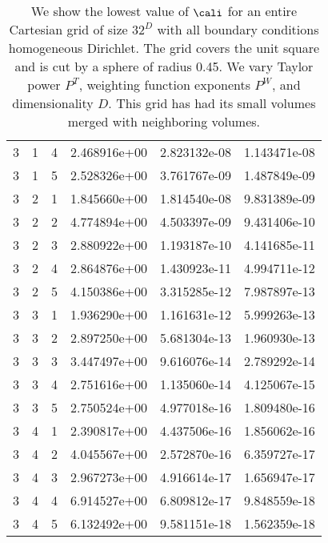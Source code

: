 \documentclass{article}
\begin{document}
{\begin{small}
\begin{table}
\begin{center}
\begin{tabular}{|ccc|ccc|}
3 & 1 & 4  & 2.468916e+00 & 2.823132e-08 & 1.143471e-08 \\ 
3 & 1 & 5  & 2.528326e+00 & 3.761767e-09 & 1.487849e-09 \\ 
3 & 2 & 1  & 1.845660e+00 & 1.814540e-08 & 9.831389e-09 \\ 
3 & 2 & 2  & 4.774894e+00 & 4.503397e-09 & 9.431406e-10 \\ 
3 & 2 & 3  & 2.880922e+00 & 1.193187e-10 & 4.141685e-11 \\ 
3 & 2 & 4  & 2.864876e+00 & 1.430923e-11 & 4.994711e-12 \\ 
3 & 2 & 5  & 4.150386e+00 & 3.315285e-12 & 7.987897e-13 \\ 
3 & 3 & 1  & 1.936290e+00 & 1.161631e-12 & 5.999263e-13 \\ 
3 & 3 & 2  & 2.897250e+00 & 5.681304e-13 & 1.960930e-13 \\ 
3 & 3 & 3  & 3.447497e+00 & 9.616076e-14 & 2.789292e-14 \\ 
3 & 3 & 4  & 2.751616e+00 & 1.135060e-14 & 4.125067e-15 \\ 
3 & 3 & 5  & 2.750524e+00 & 4.977018e-16 & 1.809480e-16 \\ 
3 & 4 & 1  & 2.390817e+00 & 4.437506e-16 & 1.856062e-16 \\ 
3 & 4 & 2  & 4.045567e+00 & 2.572870e-16 & 6.359727e-17 \\ 
3 & 4 & 3  & 2.967273e+00 & 4.916614e-17 & 1.656947e-17 \\ 
3 & 4 & 4  & 6.914527e+00 & 6.809812e-17 & 9.848559e-18 \\ 
3 & 4 & 5  & 6.132492e+00 & 9.581151e-18 & 1.562359e-18 \\ 
\hline
\end{tabular}
\end{center}
\label{fig::mergedDiri}
\caption
    {
      We show the lowest value of
      $\cali$ for an entire Cartesian grid of size $32^D$ with all
      boundary conditions homogeneous Dirichlet.
      The grid covers the unit square and is cut by a sphere of radius 0.45.
      We vary Taylor power $P^T$, weighting
      function exponents $P^W$, and dimensionality $D$.    This grid
      has had its small volumes merged with neighboring volumes.
    }
\end{table}
\end{small}

}
\end{document}

